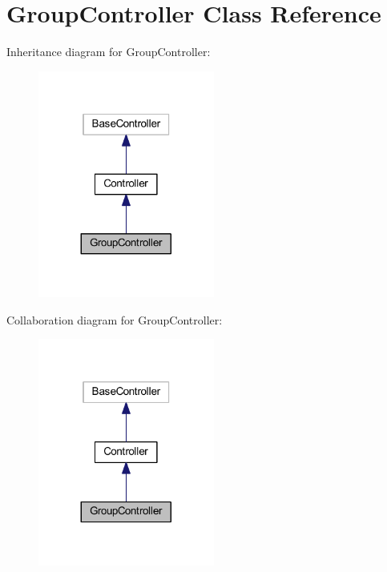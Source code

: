 \hypertarget{class_app_1_1_http_1_1_controllers_1_1_product_1_1_group_controller}{}\section{Group\+Controller Class Reference}
\label{class_app_1_1_http_1_1_controllers_1_1_product_1_1_group_controller}


Inheritance diagram for Group\+Controller\+:
\nopagebreak
\begin{figure}[H]
\begin{center}
\leavevmode
\includegraphics[width=164pt]{class_app_1_1_http_1_1_controllers_1_1_product_1_1_group_controller__inherit__graph}
\end{center}
\end{figure}


Collaboration diagram for Group\+Controller\+:
\nopagebreak
\begin{figure}[H]
\begin{center}
\leavevmode
\includegraphics[width=164pt]{class_app_1_1_http_1_1_controllers_1_1_product_1_1_group_controller__coll__graph}
\end{center}
\end{figure}
